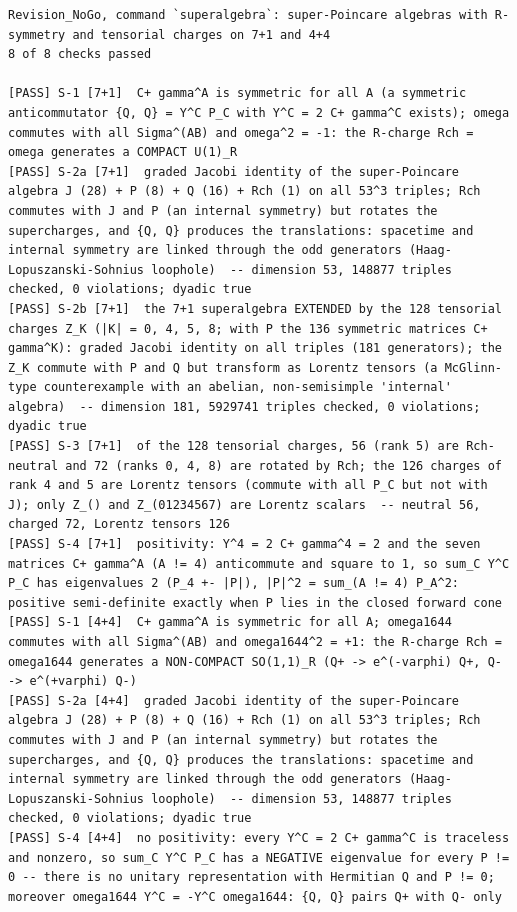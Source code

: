 \documentclass[
  10pt,
]{article}
\begin{document}
\begin{verbatim}
Revision_NoGo, command `superalgebra`: super-Poincare algebras with R-symmetry and tensorial charges on 7+1 and 4+4
8 of 8 checks passed

[PASS] S-1 [7+1]  C+ gamma^A is symmetric for all A (a symmetric anticommutator {Q, Q} = Y^C P_C with Y^C = 2 C+ gamma^C exists); omega commutes with all Sigma^(AB) and omega^2 = -1: the R-charge Rch = omega generates a COMPACT U(1)_R
[PASS] S-2a [7+1]  graded Jacobi identity of the super-Poincare algebra J (28) + P (8) + Q (16) + Rch (1) on all 53^3 triples; Rch commutes with J and P (an internal symmetry) but rotates the supercharges, and {Q, Q} produces the translations: spacetime and internal symmetry are linked through the odd generators (Haag-Lopuszanski-Sohnius loophole)  -- dimension 53, 148877 triples checked, 0 violations; dyadic true
[PASS] S-2b [7+1]  the 7+1 superalgebra EXTENDED by the 128 tensorial charges Z_K (|K| = 0, 4, 5, 8; with P the 136 symmetric matrices C+ gamma^K): graded Jacobi identity on all triples (181 generators); the Z_K commute with P and Q but transform as Lorentz tensors (a McGlinn-type counterexample with an abelian, non-semisimple 'internal' algebra)  -- dimension 181, 5929741 triples checked, 0 violations; dyadic true
[PASS] S-3 [7+1]  of the 128 tensorial charges, 56 (rank 5) are Rch-neutral and 72 (ranks 0, 4, 8) are rotated by Rch; the 126 charges of rank 4 and 5 are Lorentz tensors (commute with all P_C but not with J); only Z_() and Z_(01234567) are Lorentz scalars  -- neutral 56, charged 72, Lorentz tensors 126
[PASS] S-4 [7+1]  positivity: Y^4 = 2 C+ gamma^4 = 2 and the seven matrices C+ gamma^A (A != 4) anticommute and square to 1, so sum_C Y^C P_C has eigenvalues 2 (P_4 +- |P|), |P|^2 = sum_(A != 4) P_A^2: positive semi-definite exactly when P lies in the closed forward cone
[PASS] S-1 [4+4]  C+ gamma^A is symmetric for all A; omega1644 commutes with all Sigma^(AB) and omega1644^2 = +1: the R-charge Rch = omega1644 generates a NON-COMPACT SO(1,1)_R (Q+ -> e^(-varphi) Q+, Q- -> e^(+varphi) Q-)
[PASS] S-2a [4+4]  graded Jacobi identity of the super-Poincare algebra J (28) + P (8) + Q (16) + Rch (1) on all 53^3 triples; Rch commutes with J and P (an internal symmetry) but rotates the supercharges, and {Q, Q} produces the translations: spacetime and internal symmetry are linked through the odd generators (Haag-Lopuszanski-Sohnius loophole)  -- dimension 53, 148877 triples checked, 0 violations; dyadic true
[PASS] S-4 [4+4]  no positivity: every Y^C = 2 C+ gamma^C is traceless and nonzero, so sum_C Y^C P_C has a NEGATIVE eigenvalue for every P != 0 -- there is no unitary representation with Hermitian Q and P != 0; moreover omega1644 Y^C = -Y^C omega1644: {Q, Q} pairs Q+ with Q- only
\end{verbatim}
\end{document}
